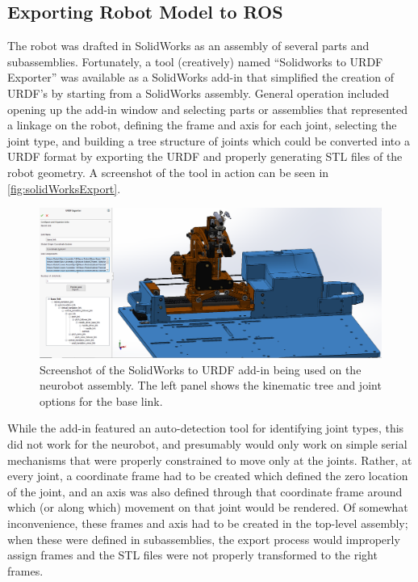 \documentclass[12pt]{report}
\makeatletter
\renewcommand{\todo}[2][]{%
    \@todo[caption={#2}, #1]{\begin{spacing}{0.5}#2\end{spacing}}%
}
\makeatother
\begin{document}
\subsection{Exporting Robot Model to ROS}
The robot was drafted in SolidWorks as an assembly of several parts and subassemblies. Fortunately, a tool (creatively) named ``Solidworks to URDF Exporter'' was available as a SolidWorks add-in that simplified the creation of URDF's by starting from a SolidWorks assembly. \todo{GF: can you cite this} General operation included opening up the add-in window and selecting parts or assemblies that represented a linkage on the robot, defining the frame and axis for each joint, selecting the joint type, and building a tree structure of joints which could be converted into a URDF format by exporting the URDF and properly generating STL files of the robot geometry. A screenshot of the tool in action can be seen in \autoref{fig:solidWorksExport}.

\begin{figure}[thpb]
	\centering
	\includegraphics[width=\textwidth]{images/solidworks_to_urdf_screenshot.PNG}
    \caption{Screenshot of the SolidWorks to URDF add-in being used on the neurobot assembly. The left panel shows the kinematic tree and joint options for the base link.}
    \label{fig:solidWorksExport}
\end{figure}

While the add-in featured an auto-detection tool for identifying joint types, this did not work for the neurobot, and presumably would only work on simple serial mechanisms that were properly constrained to move only at the joints. Rather, at every joint, a coordinate frame had to be created which defined the zero location of the joint, and an axis was also defined through that coordinate frame around which (or along which) movement on that joint would be rendered. Of somewhat inconvenience, these frames and axis had to be created in the top-level assembly; when these were defined in subassemblies, the export process would improperly assign frames and the STL files were not properly transformed to the right frames.
\end{document}
